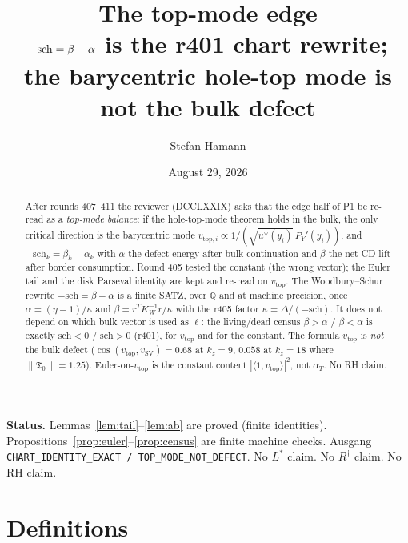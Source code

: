 \documentclass[11pt]{article}
\title{\bfseries The top-mode edge\\[2mm]
\large $-\sch=\beta-\alpha$ is the r401 chart rewrite;
the barycentric hole-top mode is not the bulk defect}
\author{Stefan Hamann}
\date{August 29, 2026}
\theoremstyle{remark}
\newcommand{\Tfrak}{\mathfrak{T}}
\newcommand{\sch}{\mathrm{sch}}
\begin{document}
\maketitle

\begin{abstract}\noindent
After rounds 407--411 the reviewer (DCCLXXIX) asks that the
edge half of P1 be re-read as a \emph{top-mode balance}:
if the hole-top-mode theorem holds in the bulk, the only
critical direction is the barycentric mode
$v_{\mathrm{top},i}\propto 1/(\sqrt{u^\vee(y_i)}\,P_Y'(y_i))$,
and $-\sch_k=\beta_k-\alpha_k$ with $\alpha$ the defect energy
after bulk continuation and $\beta$ the net CD lift after
border consumption.
Round 405 tested the constant (the wrong vector); the Euler
tail and the disk Parseval identity are kept and re-read on
$v_{\mathrm{top}}$.
The Woodbury--Schur rewrite $-\sch=\beta-\alpha$ is a finite
SATZ, over $\mathbb{Q}$ and at machine precision, once
$\alpha=(\eta-1)/\kappa$ and
$\beta=r^T K_W^{-1}r/\kappa$ with the r405 factor
$\kappa=\Delta/(-\sch)$.
It does not depend on which bulk vector is used as $\ell$:
the living/dead census $\beta>\alpha$ / $\beta<\alpha$ is
exactly $\sch<0$ / $\sch>0$ (r401), for $v_{\mathrm{top}}$
and for the constant.
The formula $v_{\mathrm{top}}$ is \emph{not} the bulk defect
($\cos(v_{\mathrm{top}},v_{\mathrm{SV}})=0.68$ at $k_z=9$,
$0.058$ at $k_z=18$ where $\|\Tfrak_0\|=1.25$).
Euler-on-$v_{\mathrm{top}}$ is the constant content
$|\langle 1,v_{\mathrm{top}}\rangle|^2$, not $\alpha_T$.
No RH claim.
\end{abstract}

\medskip\noindent
\textbf{Status.}\enspace
Lemmas~\ref{lem:tail}--\ref{lem:ab} are proved (finite
identities).
Propositions~\ref{prop:euler}--\ref{prop:census} are finite
machine checks.
Ausgang \texttt{CHART\_IDENTITY\_EXACT / TOP\_MODE\_NOT\_DEFECT}.
No $L^*$ claim.  No $R^\dagger$ claim.  No RH claim.

\section{Definitions}\label{sec:def}
\end{document}
